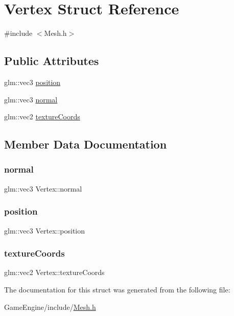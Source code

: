 \hypertarget{struct_vertex}{}\section{Vertex Struct Reference}
\label{struct_vertex}


{\ttfamily \#include $<$Mesh.\+h$>$}

\subsection*{Public Attributes}
\begin{DoxyCompactItemize}
\item 
glm\+::vec3 \mbox{\hyperlink{struct_vertex_a030819fdc241743bbd3e180a6b132ed3}{position}}
\item 
glm\+::vec3 \mbox{\hyperlink{struct_vertex_a3aa35fe84025ecf1acccb5f65f5577fd}{normal}}
\item 
glm\+::vec2 \mbox{\hyperlink{struct_vertex_a03ba1fdd25400383cd40bd2153d08ef1}{texture\+Coords}}
\end{DoxyCompactItemize}


\subsection{Member Data Documentation}
\mbox{\label{struct_vertex_a3aa35fe84025ecf1acccb5f65f5577fd}} 
\subsubsection{\texorpdfstring{normal}{normal}}
{\footnotesize\ttfamily glm\+::vec3 Vertex\+::normal}

\mbox{\label{struct_vertex_a030819fdc241743bbd3e180a6b132ed3}} 
\subsubsection{\texorpdfstring{position}{position}}
{\footnotesize\ttfamily glm\+::vec3 Vertex\+::position}

\mbox{\label{struct_vertex_a03ba1fdd25400383cd40bd2153d08ef1}} 
\subsubsection{\texorpdfstring{texture\+Coords}{textureCoords}}
{\footnotesize\ttfamily glm\+::vec2 Vertex\+::texture\+Coords}



The documentation for this struct was generated from the following file\+:\begin{DoxyCompactItemize}
\item 
Game\+Engine/include/\mbox{\hyperlink{_mesh_8h}{Mesh.\+h}}\end{DoxyCompactItemize}
